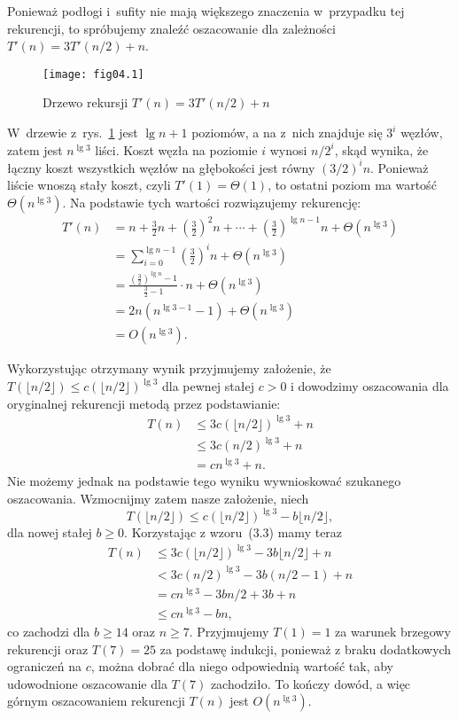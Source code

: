 
\exercise %
Ponieważ podłogi i~sufity nie mają większego znaczenia w~przypadku tej rekurencji, to spróbujemy znaleźć oszacowanie dla zależności $T'(n)=3T'(n/2)+n$.
\begin{figure}[ht]
	\begin{center}
		\texttt{[image: fig04.1]}
	\end{center}
	\caption{Drzewo rekursji $T'(n)=3T'(n/2)+n$} \label{fig:4.2-1}
\end{figure}
W~drzewie z~rys.~\ref{fig:4.2-1} jest $\lg n+1$ poziomów, a na  z~nich znajduje się $3^i$ węzłów, zatem jest $n^{\lg3}$ liści. Koszt węzła na poziomie $i$ wynosi $n/2^i$, skąd wynika, że łączny koszt wszystkich węzłów na  głębokości jest równy $(3/2)^in$. Ponieważ liście wnoszą stały koszt, czyli $T'(1)=\Theta(1)$, to ostatni poziom ma wartość $\Theta(n^{\lg3})$. Na podstawie tych wartości rozwiązujemy rekurencję:
\begin{align*}
	T'(n) &= n+\frac{3}{2}n+\left(\frac{3}{2}\right)^2n+\cdots+\left(\frac{3}{2}\right)^{\lg n-1}n+\Theta(n^{\lg 3}) \\
	&= \sum_{i=0}^{\lg n-1}\left(\frac{3}{2}\right)^in+\Theta(n^{\lg 3}) \\
	&= \frac{\left(\frac{3}{2}\right)^{\lg n}-1}{\frac{3}{2}-1}\cdot n+\Theta(n^{\lg 3}) \\[1mm]
	&= 2n(n^{\lg 3-1}-1)+\Theta(n^{\lg 3}) \\
	&= O(n^{\lg 3}).
\end{align*}

Wykorzystując otrzymany wynik przyjmujemy założenie, że $T(\lfloor n/2\rfloor)\le c(\lfloor n/2\rfloor)^{\lg 3}$ dla pewnej stałej $c>0$ i dowodzimy oszacowania dla oryginalnej rekurencji metodą przez podstawianie:
\begin{align*}
	T(n) &\le 3c(\lfloor n/2\rfloor)^{\lg 3}+n \\
	&\le 3c(n/2)^{\lg 3}+n \\
	&= cn^{\lg 3}+n.
\end{align*}
Nie możemy jednak na podstawie tego wyniku wywnioskować szukanego oszacowania. Wzmocnijmy zatem nasze założenie, niech
\[
	T(\lfloor n/2\rfloor) \le c(\lfloor n/2\rfloor)^{\lg 3}-b\lfloor n/2\rfloor,
\]
dla nowej stałej $b\ge0$. Korzystając z wzoru~(3.3) mamy teraz
\begin{align*}
	T(n) &\le 3c(\lfloor n/2\rfloor)^{\lg 3}-3b\lfloor n/2\rfloor+n \\
	&< 3c(n/2)^{\lg 3}-3b(n/2-1)+n \\
	&= cn^{\lg 3}-3bn/2+3b+n \\
	&\le cn^{\lg 3}-bn,
\end{align*}
co zachodzi dla $b\ge14$ oraz $n\ge7$. Przyjmujemy $T(1)=1$ za warunek brzegowy rekurencji oraz $T(7)=25$ za podstawę indukcji, ponieważ z braku dodatkowych ograniczeń na $c$, można dobrać dla niego odpowiednią wartość tak, aby udowodnione oszacowanie dla $T(7)$ zachodziło. To kończy dowód, a więc górnym oszacowaniem rekurencji $T(n)$ jest $O(n^{\lg3})$.

